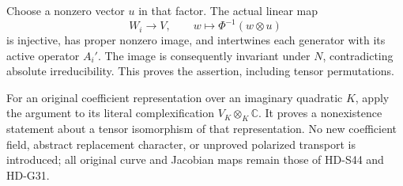 Choose a nonzero vector \(u\) in that factor. The actual
linear map
\[
 W_i\longrightarrow V,\qquad
                  w\longmapsto\Phi^{-1}(w\otimes u)        \tag{R14.8}
\]
is injective, has proper nonzero image, and intertwines
each generator with its active operator \(A_i'\).
The image is consequently invariant under \(N\),
contradicting absolute irreducibility. This proves the
assertion, including tensor permutations.

For an original coefficient representation over an
imaginary quadratic \(K\), apply the argument to its
literal complexification \(V_K\otimes_K\mathbb C\).
It proves a nonexistence statement about a tensor
isomorphism of that representation. No new coefficient
field, abstract replacement character, or unproved
polarized transport is introduced; all original curve
and Jacobian maps remain those of HD-S44 and HD-G31.
